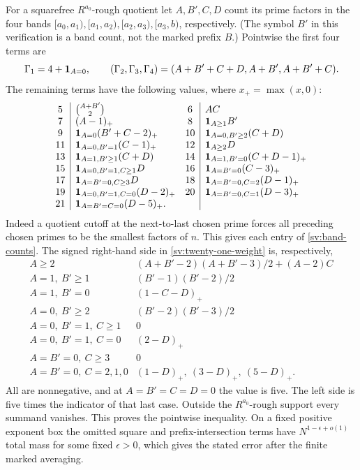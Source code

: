 For a squarefree $R^{a_0}$-rough quotient let $A,B',C,D$ count
its prime factors in the four bands
$[a_0,a_1),[a_1,a_2),[a_2,a_3),[a_3,b)$, respectively.
(The symbol $B'$ in this verification is a band count, not the
marked prefix $B$.)  Pointwise the first four terms are
\[
 \Gamma_1=4+\mathbf 1_{A=0},\qquad
 (\Gamma_2,\Gamma_3,\Gamma_4)
       =(A+B'+C+D,A+B',A+B'+C).
\]
The remaining terms have the following values, where
$x_+=\max(x,0)$:
\begin{equation}\label{sv:band-counts}
\begin{array}{c|l@{\quad}c|l}
5&\binom{A+B'}2&6&AC\\
7&(A-1)_+&8&\one_{A\ge1}B'\\
9&\one_{A=0}(B'+C-2)_+
 &10&\one_{A=0,B'\ge2}(C+D)\\
11&\one_{A=0,B'=1}(C-1)_+
 &12&\one_{A\ge2}D\\
13&\one_{A=1,B'\ge1}(C+D)
 &14&\one_{A=1,B'=0}(C+D-1)_+\\
15&\one_{A=0,B'=1,C\ge1}D
 &16&\one_{A=B'=0}(C-3)_+\\
17&\one_{A=B'=0,C\ge3}D
 &18&\one_{A=B'=0,C=2}(D-1)_+\\
19&\one_{A=0,B'=1,C=0}(D-2)_+
 &20&\one_{A=B'=0,C=1}(D-3)_+\\
21&\one_{A=B'=C=0}(D-5)_+.&&
\end{array}
\end{equation}
Indeed a quotient cutoff at the next-to-last chosen prime forces
all preceding chosen primes to be the smallest factors of $n$.
This gives each entry of \eqref{sv:band-counts}.  The signed
right-hand side in \eqref{sv:twenty-one-weight} is, respectively,
\[
\begin{array}{c|l}
A\ge2&(A+B'-2)(A+B'-3)/2+(A-2)C\\
A=1,\ B'\ge1&(B'-1)(B'-2)/2\\
A=1,\ B'=0&(1-C-D)_+\\
A=0,\ B'\ge2&(B'-2)(B'-3)/2\\
A=0,\ B'=1,\ C\ge1&0\\
A=0,\ B'=1,\ C=0&(2-D)_+\\
A=B'=0,\ C\ge3&0\\
A=B'=0,\ C=2,1,0&(1-D)_+,\ (3-D)_+,\ (5-D)_+.
\end{array}
\]
All are nonnegative, and at $A=B'=C=D=0$ the value is five.
The left side is five times the indicator of that last case.
Outside the $R^{a_0}$-rough support every summand vanishes.
This proves the pointwise inequality.  On a fixed positive exponent
box the omitted square and prefix-intersection terms have
$N^{1-\epsilon+o(1)}$ total mass for some fixed $\epsilon>0$,
which gives the stated error after the finite marked averaging.

